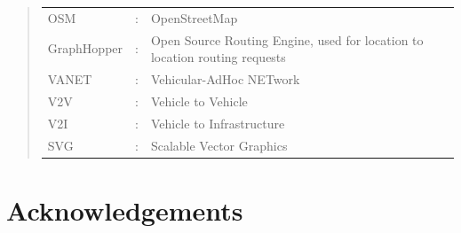 \documentclass[ %
                    author={Alexander Hill},
                supervisor={Dr. Benjamin Sach},
                    degree={MEng},
                     title={MARMOSET},
                  subtitle={Multi-Agent Route Management using Online Simulation for Efficient Transportation},
                      type={research},
                      year={2016} ]{dissertation}
\begin{document}

\begin{quote}
\noindent
\begin{tabular}{lcl}
OSM                 &:     & OpenStreetMap \\
GraphHopper         &:     & Open Source Routing Engine, used for location to
    location routing requests \\
VANET               &:     & Vehicular-AdHoc NETwork \\
V2V                 &:     & Vehicle to Vehicle \\
V2I                 &:     & Vehicle to Infrastructure \\
SVG                 &:     & Scalable Vector Graphics \\
\end{tabular}
\end{quote}


\chapter*{Acknowledgements}




%
\end{document}

